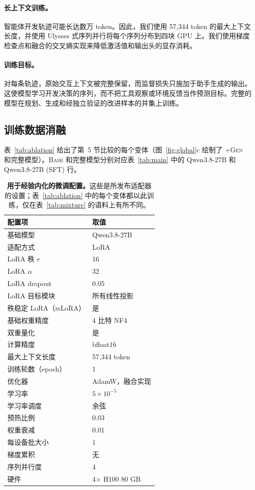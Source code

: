 \paragraph{长上下文训练。}智能体开发轨迹可能长达数万 token。因此，我们使用 57,344 token 的最大上下文长度，并使用 Ulysses 式序列并行\citep{jacobs2023}将每个序列分布到四块 GPU 上。我们使用梯度检查点和融合的交叉熵实现来降低激活值和输出头的显存消耗。

\paragraph{训练目标。}对每条轨迹，原始交互上下文被完整保留，而监督损失只施加于助手生成的输出。这使模型学习开发决策的序列，而不把工具观察或环境反馈当作预测目标。完整的 \rsig{} 模型在规划、生成和经独立验证的改进样本的并集上训练。

\subsection{训练数据消融}\label{app:ablation}
表~\ref{tab:ablation} 给出了第~5 节比较的每个变体（图~\ref{fig:global}c 绘制了 \textsc{+Gen} 和完整模型）。\textsc{Base} 和完整模型分别对应表~\ref{tab:main} 中的 Qwen3.8-27B 和 Qwen3.8-27B (SFT) 行。

\begin{table}[htbp]
\caption{\textbf{用于经验内化的微调配置。}这些是所发布适配器的设置；表~\ref{tab:ablation} 中的每个变体都以此训练，仅在表~\ref{tab:mixture} 的语料上有所不同。}
\label{tab:ftcfg}
\centering\small
\begin{tabular}{@{}ll@{}}
\toprule
配置项 & 取值 \\
\midrule
基础模型 & Qwen3.8-27B \\
适配方式 & LoRA\citep{hu2022lora} \\
LoRA 秩 $r$ & 16 \\
LoRA $\alpha$ & 32 \\
LoRA dropout & 0.05 \\
LoRA 目标模块 & 所有线性投影 \\
秩稳定 LoRA（rsLoRA） & 是 \\
基础权重精度 & 4 比特 NF4\citep{dettmers2023} \\
双重量化 & 是 \\
计算精度 & bfloat16 \\
最大上下文长度 & 57,344 token \\
训练轮数（epoch） & 1 \\
优化器 & AdamW\citep{loshchilov2019}，融合实现 \\
学习率 & $5\times10^{-5}$ \\
学习率调度 & 余弦 \\
预热比例 & 0.03 \\
权重衰减 & 0.01 \\
每设备批大小 & 1 \\
梯度累积 & 无 \\
序列并行度 & 4 \\
硬件 & 4$\times$ H100 80 GB \\
\bottomrule
\end{tabular}
\end{table}

